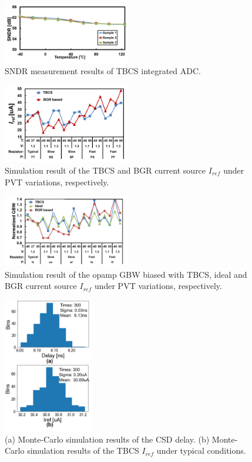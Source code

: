 \documentclass[paper]{ieice}
\begin{document}
\begin{figure}[!]
\centering
 \includegraphics[width=0.5\textwidth]{figs/sndr.png}
  \caption{SNDR measurement results of TBCS integrated ADC.}
\label{sndr}
\end{figure}

\begin{figure}[!]
\centering
 \includegraphics[width=0.5\textwidth]{figs/pvt.png}
  \caption{Simulation result of the TBCS and BGR current source $I_{ref}$ under PVT variations, respectively.
}
\label{iref_pvt_both}
\end{figure}

\begin{figure}[!]
\centering
 \includegraphics[width=0.5\textwidth]{figs/pvt_gbw.png}
  \caption{Simulation result of the opamp GBW biased with TBCS, ideal and BGR current source $I_{ref}$ under PVT variations, respectively.
}
\label{iref_gbw}
\end{figure}

\begin{figure}[!]
\centering
 \includegraphics[width=0.35\textwidth]{figs/mc.png}
  \caption{(a) Monte-Carlo simulation results of the CSD delay. (b) Monte-Carlo simulation results of the TBCS $I_{ref}$ under typical conditions.
}
\label{monte}
\end{figure}
\end{document}
